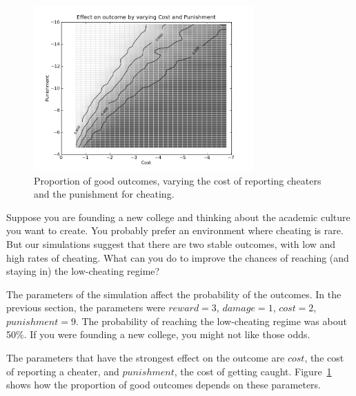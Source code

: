 \documentclass[10pt]{book}
\begin{document}
\begin{figure}
  \begin{center}
    \includegraphics[width=0.75\textwidth]{figs/varyCP_09.png}
  \end{center}
  \caption{Proportion of good outcomes, varying the cost of reporting cheaters and the punishment for cheating.}\label{fig.varyCP}
\end{figure}

Suppose you are founding a new college and thinking about the academic
culture you want to create.  You probably prefer an
environment where cheating is rare.  But our simulations suggest that
there are two stable outcomes, with low and high rates of cheating.
What can you do to improve the chances of reaching (and staying in)
the low-cheating regime?

The parameters of the simulation affect the probability of the
outcomes.  In the previous section, the parameters were $reward = 3$,
$damage = 1$, $cost = 2$, $punishment = 9$.  The probability of
reaching the low-cheating regime was about 50\%.  If you were
founding a new college, you might not like those odds.

The parameters that have the strongest effect on the outcome are
$cost$, the cost of reporting a cheater, and $punishment$, the cost
of getting caught.  Figure~\ref{fig.varyCP}
shows how the proportion of good outcomes depends on these parameters.

\end{document}
